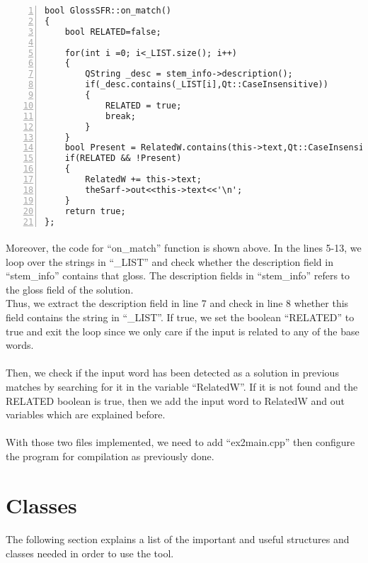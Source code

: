 \documentclass{article}
\begin{document}
\begin{Verbatim}[numbers=left]
bool GlossSFR::on_match()
{
    bool RELATED=false;

    for(int i =0; i<_LIST.size(); i++)
    {
        QString _desc = stem_info->description();
        if(_desc.contains(_LIST[i],Qt::CaseInsensitive))
        {
            RELATED = true;
            break;
        }
    }
    bool Present = RelatedW.contains(this->text,Qt::CaseInsensitive);
    if(RELATED && !Present)
    {
        RelatedW += this->text;
        theSarf->out<<this->text<<'\n';
    }
    return true;
};
\end{Verbatim}

\paragraph{}
Moreover, the code for ``on\_match'' function is shown above. In the lines 5-13, we loop over the strings in ``\_LIST'' and check whether the description field in ``stem\_info'' contains that gloss. The description fields in ``stem\_info'' refers to the gloss field of the solution.\\
Thus, we extract the description field in line 7 and check in line 8 whether this field contains the string in ``\_LIST''.  If true, we set the boolean ``RELATED'' to true and exit the loop since we only care if the input is related to any of the base words.

\paragraph{}
Then, we check if the input word has been detected as a solution in previous matches by searching for it in the variable ``RelatedW''. If it is not found and the RELATED boolean is true, then we add the input word to RelatedW and out variables which are explained before.

\paragraph{}
With those two files implemented, we need to add ``ex2main.cpp'' then configure the program for compilation as previously done.

\section{Classes}
\label{sec:classes}

\paragraph{}
The following section explains a list of the important and useful structures and classes needed in order to use the tool.
\end{document}
